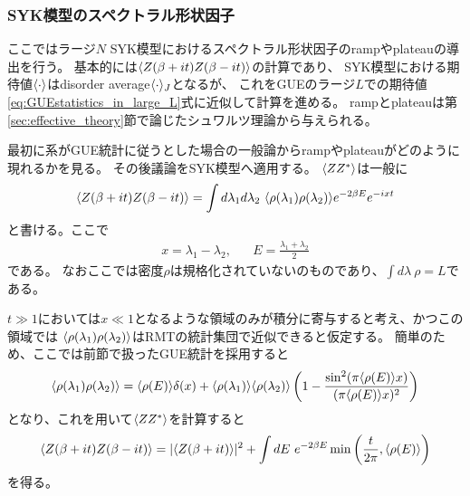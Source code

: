 \subsubsection{SYK模型のスペクトラル形状因子}
ここではラージ$N$ SYK模型におけるスペクトラル形状因子のrampやplateauの導出を行う。
基本的には$\langle Z(\beta + it)Z(\beta - it) \rangle$の計算であり、
SYK模型における期待値$\langle \cdot \rangle$はdisorder average$\langle \cdot \rangle_J$となるが、
これをGUEのラージ$L$での期待値\eqref{eq:GUEstatistics_in_large_L}式に近似して計算を進める。
rampとplateauは第\ref{sec:effective_theory}節で論じたシュワルツ理論から与えられる。

最初に系がGUE統計に従うとした場合の一般論からrampやplateauがどのように現れるかを見る。
その後議論をSYK模型へ適用する。
$\langle ZZ^* \rangle$は一般に
\begin{align}
	\average{Z(\beta + it)Z(\beta - it)}
	= \int d\lambda_1d\lambda_2\ \average{\rho(\lambda_1)\rho(\lambda_2)}
		e^{-2\beta E}e^{-ixt}
\end{align}
と書ける。ここで
\begin{align}
	x = \lambda_1 - \lambda_2,\hspace{20pt}
	E = \frac{\lambda_1 + \lambda_2}{2}
\end{align}
である。
なおここでは密度$\rho$は規格化されていないのものであり、$\int d\lambda\ \rho = L$である。

$t \gg 1$においては$x \ll 1$となるような領域のみが積分に寄与すると考え、かつこの領域では
$\langle \rho(\lambda_1)\rho(\lambda_2) \rangle$はRMTの統計集団で近似できると仮定する。
簡単のため、ここでは前節で扱ったGUE統計を採用すると
\begin{align}
	\langle \rho(\lambda_1)\rho(\lambda_2) \rangle
	= \langle \rho(E) \rangle\delta(x)
		+ \langle \rho(\lambda_1) \rangle\langle \rho(\lambda_2) \rangle
		\left(1 - 
			\frac{\sin^2(\pi\langle \rho(E) \rangle x)}{(\pi\langle \rho(E) \rangle x)^2}		
		\right)
\end{align}
となり、これを用いて$\langle ZZ^* \rangle$を計算すると
\begin{align}
	\langle Z(\beta + it)Z(\beta - it) \rangle
	= |\langle Z(\beta + it) \rangle|^2 + \int dE\ e^{-2\beta E}
		\min\left(\frac{t}{2\pi}, \langle \rho(E) \rangle\right)
	\label{eq:average_of_ZZ}
\end{align}
を得る。

